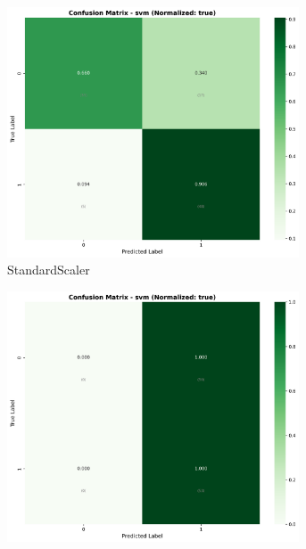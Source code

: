 \begin{figure}[H]\centering
\begin{subfigure}[b]{0.31\textwidth}\centering
\includegraphics[width=0.95\textwidth]{Result/heart_dataset/confusion_matrices/svm_numeric_dataset_StandardScaler.png}
\caption{StandardScaler}\label{fig:svm_heart_cm_standard}
\end{subfigure}\hfill
\begin{subfigure}[b]{0.31\textwidth}\centering
\includegraphics[width=0.95\textwidth]{Result/heart_dataset/confusion_matrices/svm_numeric_dataset_MinMaxScaler.png}

\end{subfigure}
\end{figure}
